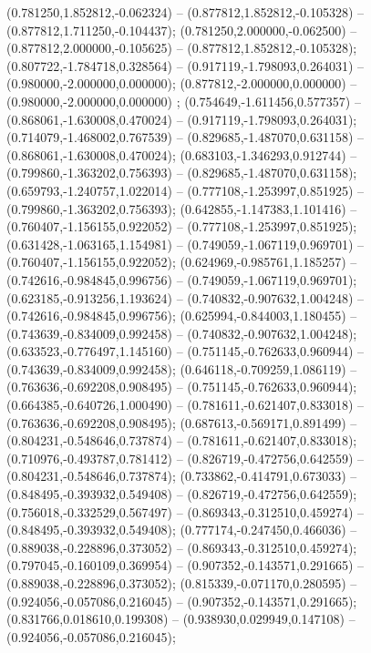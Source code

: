  (0.781250,1.852812,-0.062324) -- (0.877812,1.852812,-0.105328) -- (0.877812,1.711250,-0.104437);
 (0.781250,2.000000,-0.062500) -- (0.877812,2.000000,-0.105625) -- (0.877812,1.852812,-0.105328);
 (0.807722,-1.784718,0.328564) -- (0.917119,-1.798093,0.264031) -- (0.980000,-2.000000,0.000000);
 (0.877812,-2.000000,0.000000) -- (0.980000,-2.000000,0.000000) ;
 (0.754649,-1.611456,0.577357) -- (0.868061,-1.630008,0.470024) -- (0.917119,-1.798093,0.264031);
 (0.714079,-1.468002,0.767539) -- (0.829685,-1.487070,0.631158) -- (0.868061,-1.630008,0.470024);
 (0.683103,-1.346293,0.912744) -- (0.799860,-1.363202,0.756393) -- (0.829685,-1.487070,0.631158);
 (0.659793,-1.240757,1.022014) -- (0.777108,-1.253997,0.851925) -- (0.799860,-1.363202,0.756393);
 (0.642855,-1.147383,1.101416) -- (0.760407,-1.156155,0.922052) -- (0.777108,-1.253997,0.851925);
 (0.631428,-1.063165,1.154981) -- (0.749059,-1.067119,0.969701) -- (0.760407,-1.156155,0.922052);
 (0.624969,-0.985761,1.185257) -- (0.742616,-0.984845,0.996756) -- (0.749059,-1.067119,0.969701);
 (0.623185,-0.913256,1.193624) -- (0.740832,-0.907632,1.004248) -- (0.742616,-0.984845,0.996756);
 (0.625994,-0.844003,1.180455) -- (0.743639,-0.834009,0.992458) -- (0.740832,-0.907632,1.004248);
 (0.633523,-0.776497,1.145160) -- (0.751145,-0.762633,0.960944) -- (0.743639,-0.834009,0.992458);
 (0.646118,-0.709259,1.086119) -- (0.763636,-0.692208,0.908495) -- (0.751145,-0.762633,0.960944);
 (0.664385,-0.640726,1.000490) -- (0.781611,-0.621407,0.833018) -- (0.763636,-0.692208,0.908495);
 (0.687613,-0.569171,0.891499) -- (0.804231,-0.548646,0.737874) -- (0.781611,-0.621407,0.833018);
 (0.710976,-0.493787,0.781412) -- (0.826719,-0.472756,0.642559) -- (0.804231,-0.548646,0.737874);
 (0.733862,-0.414791,0.673033) -- (0.848495,-0.393932,0.549408) -- (0.826719,-0.472756,0.642559);
 (0.756018,-0.332529,0.567497) -- (0.869343,-0.312510,0.459274) -- (0.848495,-0.393932,0.549408);
 (0.777174,-0.247450,0.466036) -- (0.889038,-0.228896,0.373052) -- (0.869343,-0.312510,0.459274);
 (0.797045,-0.160109,0.369954) -- (0.907352,-0.143571,0.291665) -- (0.889038,-0.228896,0.373052);
 (0.815339,-0.071170,0.280595) -- (0.924056,-0.057086,0.216045) -- (0.907352,-0.143571,0.291665);
 (0.831766,0.018610,0.199308) -- (0.938930,0.029949,0.147108) -- (0.924056,-0.057086,0.216045);
